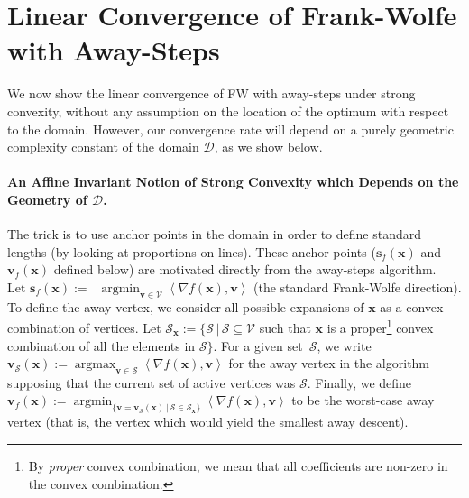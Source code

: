\documentclass{article} %
\DeclareMathOperator*{\argmin}{\arg\min}
\DeclareMathOperator*{\argmax}{\arg\max}
\newcommand{\domain}{\mathcal{D}}
\newcommand{\x}{\bm{x}}
\newcommand{\s}{\bm{s}}
\newcommand{\vv}{\bm{v}} %
\newcommand{\Vertices}{\mathcal{V}}
\renewcommand{\S}{\mathcal{S}}
\newcommand{\0}{\mathbf{0}} %
\begin{document}
%
%
%
%
%
%
%
%
%
%
%
%
%
%
%
%
%
%
%
%
%
%
%
%
%
%
%
%
%
%
%
%
%
%
%
%
%
%
%
%
%
%




\vspace{-2mm}
%
\section{Linear Convergence of Frank-Wolfe with Away-Steps}\vspace{-2mm}%
\label{sec:convMFV}

We now show the linear convergence of FW with away-steps under strong convexity, without any assumption on the location of the optimum with respect to the domain.
However, our convergence rate will depend on a purely geometric complexity constant of the domain $\domain$, as we show below.
%
%
%

%
%
%
%
%
%
%
%
%
%
%
%



\vspace{-2mm}
\paragraph{An Affine Invariant Notion of Strong Convexity which Depends on the Geometry of $\domain$.}

The trick is to use anchor points in the domain in order to define standard lengths (by looking at proportions on lines). These anchor points ($\s_f(\x)$ and $\vv_f(\x)$ defined below) are motivated directly from the away-steps algorithm.\\
%
Let $\s_f(\x) :=$%
$~\argmin_{\vv \in \Vertices} \left\langle \nabla f(\x), \vv \right\rangle$ (the standard Frank-Wolfe direction).
To define the away-vertex, we consider all possible expansions of $\x$ as a convex combination of vertices.
%
Let $\S_{\x} := \{ \S \, | \, \S \subseteq \Vertices$ such that $\x$ is a proper\footnote{By \emph{proper} convex combination, we mean that all coefficients are non-zero in the convex combination.} convex combination of all the elements in $\S\}$.
For a given set~$\S$, we write $\vv_{\S}(\x) := \argmax_{\vv \in \S } \left\langle \nabla f(\x), \vv \right\rangle$ for the away vertex in the algorithm supposing that the current set of active vertices was $\S$.
Finally, we define $\vv_f(\x) := \displaystyle\argmin_{\{\vv = \vv_{\S}(\x) \,|\, \S \in \S_{\x} \}} \textstyle\left\langle \nabla f(\x), \vv \right\rangle$ to be the worst-case away vertex (that is, the vertex which would yield the smallest away descent).
\end{document}
